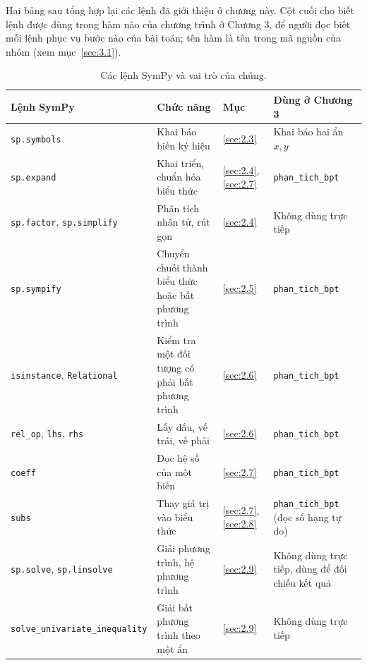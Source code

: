 \documentclass[12pt,a4paper]{report}
\begin{document}
Hai bảng sau tổng hợp lại các lệnh đã giới thiệu ở chương này. Cột cuối cho biết lệnh được dùng trong hàm nào của chương trình ở Chương 3, để người đọc biết mỗi lệnh phục vụ bước nào của bài toán; tên hàm là tên trong mã nguồn của nhóm (xem mục~\ref{sec:3.1}).

\begin{table}[H]
\centering
\footnotesize
\begin{tabular}{@{}>{\raggedright\arraybackslash}p{4.2cm}>{\raggedright\arraybackslash}p{4.1cm}>{\raggedright\arraybackslash}p{1.3cm}>{\raggedright\arraybackslash}p{4.9cm}@{}}
\toprule
Lệnh SymPy & Chức năng & Mục & Dùng ở Chương 3 \\
\midrule
\texttt{sp.symbols} & Khai báo biến ký hiệu & \ref{sec:2.3} & Khai báo hai ẩn $x,y$ \\
\texttt{sp.expand} & Khai triển, chuẩn hóa biểu thức & \ref{sec:2.4}, \ref{sec:2.7} & \texttt{phan\_tich\_bpt} \\
\texttt{sp.factor}, \texttt{sp.simplify} & Phân tích nhân tử, rút gọn & \ref{sec:2.4} & Không dùng trực tiếp \\
\texttt{sp.sympify} & Chuyển chuỗi thành biểu thức hoặc bất phương trình & \ref{sec:2.5} & \texttt{phan\_tich\_bpt} \\
\texttt{isinstance}, \texttt{Relational} & Kiểm tra một đối tượng có phải bất phương trình & \ref{sec:2.6} & \texttt{phan\_tich\_bpt} \\
\texttt{rel\_op}, \texttt{lhs}, \texttt{rhs} & Lấy dấu, vế trái, vế phải & \ref{sec:2.6} & \texttt{phan\_tich\_bpt} \\
\texttt{coeff} & Đọc hệ số của một biến & \ref{sec:2.7} & \texttt{phan\_tich\_bpt} \\
\texttt{subs} & Thay giá trị vào biểu thức & \ref{sec:2.7}, \ref{sec:2.8} & \texttt{phan\_tich\_bpt} (đọc số hạng tự do) \\
\texttt{sp.solve}, \texttt{sp.linsolve} & Giải phương trình, hệ phương trình & \ref{sec:2.9} & Không dùng trực tiếp, dùng để đối chiếu kết quả \\
\texttt{solve\_univariate\_\allowbreak inequality} & Giải bất phương trình theo một ẩn & \ref{sec:2.9} & Không dùng trực tiếp \\
\bottomrule
\end{tabular}
\caption{Các lệnh SymPy và vai trò của chúng.}
\label{tab:lenh-sympy}
\end{table}
\end{document}
